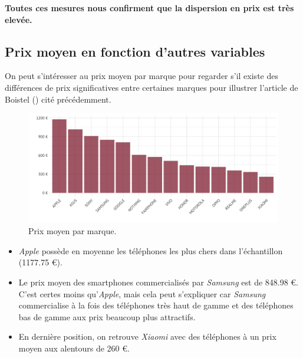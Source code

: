 \documentclass[
  12pt,
]{report}
\begin{document}
\textbf{Toutes ces mesures nous confirment que la dispersion en prix est
très elevée.}

\subsection{Prix moyen en fonction d'autres
variables}\label{prix-moyen-en-fonction-dautres-variables}

On peut s'intéresser au prix moyen par marque pour regarder s'il existe
des différences de prix significatives entre certaines marques pour
illustrer l'article de Boistel () cité
précédemment.

\begin{figure}[H]

{\centering \includegraphics{report_files/figure-pdf/fig_mean_price-1.pdf}

}

\caption{Prix moyen par marque.}

\end{figure}%

\begin{itemize}
\item
  \emph{Apple} possède en moyenne les téléphones les plus chers dans
  l'échantillon (1177.75 €).
\item
  Le prix moyen des smartphones commercialisés par \emph{Samsung} est de
  848.98 €. C'est certes moins qu'\emph{Apple}, mais cela peut
  s'expliquer car \emph{Samsung} commercialise à la fois des téléphones
  très haut de gamme et des téléphones bas de gamme aux prix beaucoup
  plus attractifs.
\item
  En dernière position, on retrouve \emph{Xiaomi} avec des téléphones à
  un prix moyen aux alentours de 260 €.
\end{itemize}

\newpage
\end{document}
